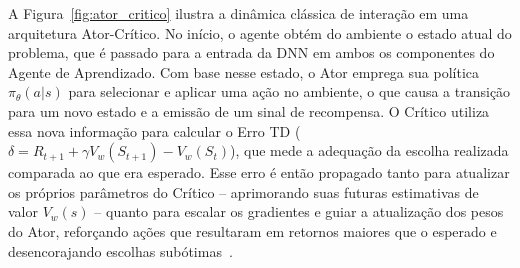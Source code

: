 A Figura~\ref{fig:ator_critico} ilustra a dinâmica clássica de interação em uma arquitetura Ator-Crítico. No início, o agente obtém do ambiente o estado atual do problema, que é passado para a entrada da \gls{DNN} em ambos os componentes do Agente de Aprendizado. Com base nesse estado, o Ator emprega sua política $\pi_\theta(a|s)$ para selecionar e aplicar uma ação no ambiente, o que causa a transição para um novo estado e a emissão de um sinal de recompensa. O Crítico utiliza essa nova informação para calcular o Erro TD ($\delta = R_{t+1} + \gamma V_w(S_{t+1}) - V_w(S_t)$), que mede a adequação da escolha realizada comparada ao que era esperado. Esse erro é então propagado tanto para atualizar os próprios parâmetros do Crítico -- aprimorando suas futuras estimativas de valor $V_w(s)$ -- quanto para escalar os gradientes e guiar a atualização dos pesos do Ator, reforçando ações que resultaram em retornos maiores que o esperado e desencorajando escolhas subótimas~\cite{sutton2018}.



